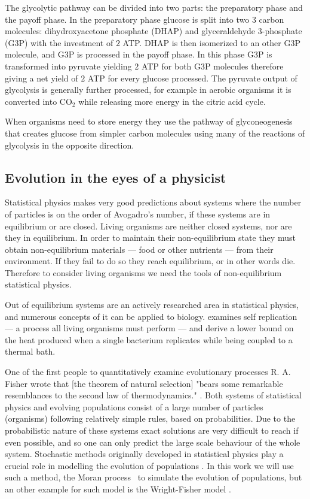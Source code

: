 \documentclass[a4paper,12pt]{article}
\begin{document}
The glycolytic pathway can be divided into two parts: the preparatory phase and the payoff phase. In the preparatory phase glucose is split into two $3$ carbon molecules: dihydroxyacetone phosphate (DHAP) and glyceraldehyde 3-phosphate (G3P) with the investment of $2$ ATP. DHAP is then isomerized to an other G3P molecule, and G3P is processed in the payoff phase. In this phase G3P is transformed into pyruvate yielding $2$ ATP for both G3P molecules therefore giving a net yield of $2$ ATP for every glucose processed. The pyruvate output of glycolysis is generally further processed, for example in aerobic organisms it is converted into CO$_2$ while releasing more energy in the citric acid cycle. 

When organisms need to store energy they use the pathway of glyconeogenesis that creates glucose from simpler carbon molecules using many of the reactions of glycolysis in the opposite direction. %
	\subsection{Evolution in the eyes of a physicist}\label{chap:whereisphysics}

	Statistical physics makes very good predictions about systems where the number of particles is on the order of Avogadro's number, if these systems are in equilibrium or are closed. Living organisms are neither closed systems, nor are they in equilibrium. In order to maintain their non-equilibrium state they must obtain non-equilibrium materials --- food or other nutrients --- from their environment. If they fail to do so they reach equilibrium, or in other words die. \cite{irreversibility} Therefore to consider living organisms we need the tools of non-equilibrium statistical physics. 

	Out of equilibrium systems are an actively researched area in statistical physics, and numerous concepts of it can be applied to biology. \cite{selfreplication} examines self replication --- a process all living organisms must perform --- and derive a lower bound on the heat produced when a single bacterium replicates while being coupled to a thermal bath. 
	
	One of the first people to quantitatively examine evolutionary processes R. A. Fisher wrote that [the theorem of natural selection] "bears some remarkable resemblances to the second law of thermodynamics." \cite{fisherevolution}. Both systems of statistical physics and evolving populations consist of a large number of particles (organisms) following relatively simple rules, based on probabilities. Due to the probabilistic nature of these systems exact solutions are very difficult to reach if even possible, and so one can only predict the large scale behaviour of the whole system. Stochastic methods originally developed in statistical physics play a crucial role in modelling the evolution of populations \cite{stochasticblythe}. In this work we will use such a method, the Moran process \cite{moranprocess}~to simulate the evolution of populations, but an other example for such model is the Wright-Fisher model \cite{mathematicalpopgen}.
\end{document}
